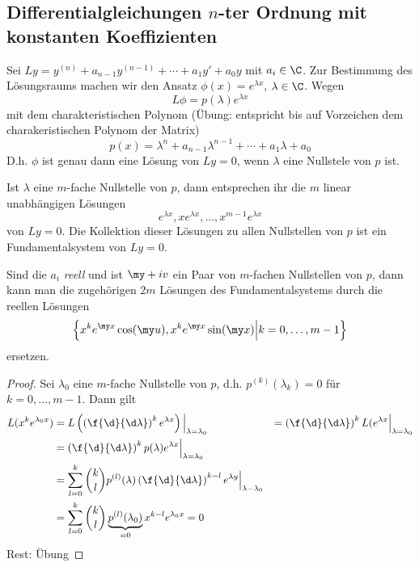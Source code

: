 \documentclass[a4paper,10pt]{scrartcl}
\begin{document}
\subsection{Differentialgleichungen $n$-ter Ordnung mit konstanten Koeffizienten}


Sei $Ly = y^{(n)} + a_{n-1}y^{(n-1)}+ \dotsb + a_1y' + a_0 y$ mit $a_i \in \C$.
Zur Bestimmung des Lösungsraums machen wir den Ansatz $\phi(x) = e^{\lambda x}$, $\lambda\in \C$.
Wegen
\[
	L\phi = p(\lambda)e^{\lambda x}
\]
mit dem charakteristischen Polynom (Übung: entspricht bis auf Vorzeichen dem charakeristischen Polynom der Matrix)
\[
	p(x) = \lambda^n + a_{n-1}\lambda^{n-1} + \dotsb + a_1\lambda + a_0
\]
D.h. $\phi$ ist genau dann eine Lösung von $Ly=0$, wenn $\lambda$ eine Nullstele von $p$ ist.

\begin{st}
	\label{17.14}
	Ist $\lambda$ eine $m$-fache Nullstelle von $p$, dann entsprechen ihr die $m$ linear unabhängigen Lösungen
	\[
		e^{\lambda x}, xe^{\lambda x}, \dotsc, x^{m-1}e^{\lambda x}
	\]
	von $Ly=0$.
	Die Kollektion dieser Lösungen zu allen Nullstellen von $p$ ist ein Fundamentalsystem von $Ly=0$.

	Sind die $a_i$ \emph{reell} und ist $\my + iv$ ein Paar von $m$-fachen Nullstellen von $p$, dann kann man die zugehörigen $2m$ Lösungen des Fundamentalsystems durch die reellen Lösungen
	\[
		\left\{ x^ke^{\my x}\cos(\my u), x^k e^{\my x}\sin(\my x) \Big| k= 0,\dotsc, m-1\right\}
	\]
	ersetzen.
	\begin{proof}
		Sei $\lambda_0$ eine $m$-fache Nullstelle von $p$, d.h. $p^{(k)}(\lambda_k) = 0$ für $k=0,\dotsc,m-1$.
		Dann gilt
		\begin{align*}
			L (x^ke^{\lambda_0 x}) &= L\left( \left(\f{\d}{\d \lambda}\right)^k e^{\lambda x}\right) \Big|_{\lambda=\lambda_0}
			&= \left(\f{\d}{\d \lambda} \right)^k L(e^{\lambda x}\Big|_{\lambda = \lambda_0}\\
			&= \left(\f{\d}{\d \lambda}\right)^k p(\lambda) e^{\lambda x} \Big|_{\lambda = \lambda_0}\\
			&= \sum_{l=0}^k \binom{k}{l}p^{(l)}(\lambda) \left( \f{\d}{\d \lambda}\right)^{k-l}e^{\lambda y}\Big|_{\lambda - \lambda_0}\\
			&= \sum_{l=0}^k \binom{k}{l}\underbrace{p^{(l)}(\lambda_0)}_{=0} x^{k-l}e^{\lambda_0 x} = 0
		\end{align*}
		Rest: Übung
	\end{proof}
\end{st}
\end{document}
